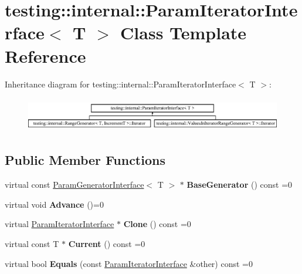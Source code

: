 \hypertarget{classtesting_1_1internal_1_1_param_iterator_interface}{}\section{testing\+:\+:internal\+:\+:Param\+Iterator\+Interface$<$ T $>$ Class Template Reference}
\label{classtesting_1_1internal_1_1_param_iterator_interface}
Inheritance diagram for testing\+:\+:internal\+:\+:Param\+Iterator\+Interface$<$ T $>$\+:\begin{figure}[H]
\begin{center}
\leavevmode
\includegraphics[height=1.517615cm]{classtesting_1_1internal_1_1_param_iterator_interface}
\end{center}
\end{figure}
\subsection*{Public Member Functions}
\begin{DoxyCompactItemize}
\item 
\mbox{\label{classtesting_1_1internal_1_1_param_iterator_interface_a17500953df75ecda1ace46c08ff731e9}} 
virtual const \mbox{\hyperlink{classtesting_1_1internal_1_1_param_generator_interface}{Param\+Generator\+Interface}}$<$ T $>$ $\ast$ {\bfseries Base\+Generator} () const =0
\item 
\mbox{\label{classtesting_1_1internal_1_1_param_iterator_interface_a600dbd35fcb551463e379516a1abea48}} 
virtual void {\bfseries Advance} ()=0
\item 
\mbox{\label{classtesting_1_1internal_1_1_param_iterator_interface_a4998c23e27e2943d97546011aa35db80}} 
virtual \mbox{\hyperlink{classtesting_1_1internal_1_1_param_iterator_interface}{Param\+Iterator\+Interface}} $\ast$ {\bfseries Clone} () const =0
\item 
\mbox{\label{classtesting_1_1internal_1_1_param_iterator_interface_adfff808576d929085679c315b255af7e}} 
virtual const T $\ast$ {\bfseries Current} () const =0
\item 
\mbox{\label{classtesting_1_1internal_1_1_param_iterator_interface_a9d811697a752d46f7bd6a0082f9040a3}} 
virtual bool {\bfseries Equals} (const \mbox{\hyperlink{classtesting_1_1internal_1_1_param_iterator_interface}{Param\+Iterator\+Interface}} \&other) const =0
\end{DoxyCompactItemize}


